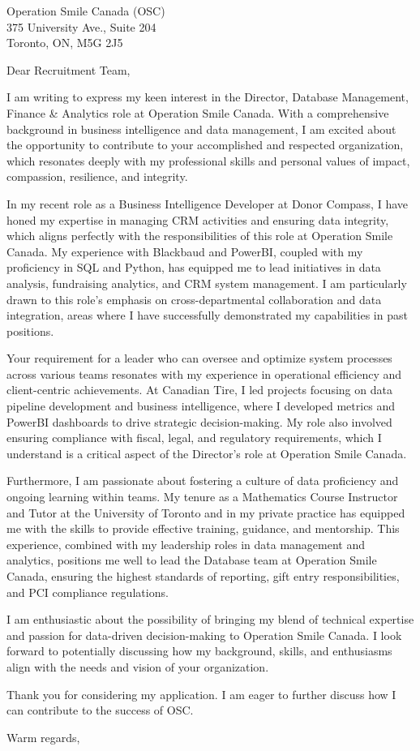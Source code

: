 \documentclass{letter}
\begin{document}
\begin{letter}{Operation Smile Canada (OSC) \\ 375 University Ave., Suite 204 \\ Toronto, ON, M5G 2J5}
\opening{Dear Recruitment Team,}

I am writing to express my keen interest in the Director, Database Management, Finance \& Analytics role at Operation Smile Canada. With a comprehensive background in business intelligence and data management, I am excited about the opportunity to contribute to your accomplished and respected organization, which resonates deeply with my professional skills and personal values of impact, compassion, resilience, and integrity.

In my recent role as a Business Intelligence Developer at Donor Compass, I have honed my expertise in managing CRM activities and ensuring data integrity, which aligns perfectly with the responsibilities of this role at Operation Smile Canada. My experience with Blackbaud and PowerBI, coupled with my proficiency in SQL and Python, has equipped me to lead initiatives in data analysis, fundraising analytics, and CRM system management. I am particularly drawn to this role's emphasis on cross-departmental collaboration and data integration, areas where I have successfully demonstrated my capabilities in past positions.

Your requirement for a leader who can oversee and optimize system processes across various teams resonates with my experience in operational efficiency and client-centric achievements. At Canadian Tire, I led projects focusing on data pipeline development and business intelligence, where I developed metrics and PowerBI dashboards to drive strategic decision-making. My role also involved ensuring compliance with fiscal, legal, and regulatory requirements, which I understand is a critical aspect of the Director's role at Operation Smile Canada.

Furthermore, I am passionate about fostering a culture of data proficiency and ongoing learning within teams. My tenure as a Mathematics Course Instructor and Tutor at the University of Toronto and in my private practice has equipped me with the skills to provide effective training, guidance, and mentorship. This experience, combined with my leadership roles in data management and analytics, positions me well to lead the Database team at Operation Smile Canada, ensuring the highest standards of reporting, gift entry responsibilities, and PCI compliance regulations.

I am enthusiastic about the possibility of bringing my blend of technical expertise and passion for data-driven decision-making to Operation Smile Canada. I look forward to potentially discussing how my background, skills, and enthusiasms align with the needs and vision of your organization.

Thank you for considering my application. I am eager to further discuss how I can contribute to the success of OSC.

\closing{Warm regards,}

\end{letter}
\end{document}

